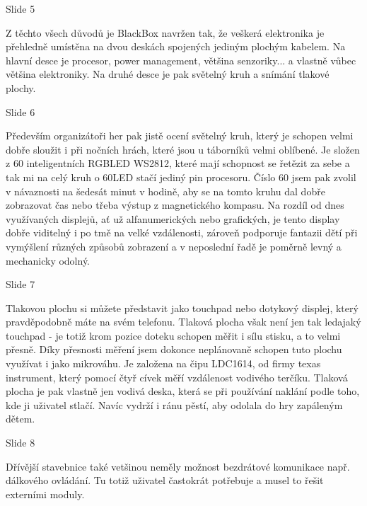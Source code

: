 
Slide 5 

Z těchto všech důvodů je BlackBox navržen tak, že  %
veškerá elektronika je přehledně umístěna na dvou deskách spojených jediným plochým kabelem.
Na hlavní desce je procesor, power management, většina
senzoriky... a vlastně vůbec většina elektroniky. Na druhé desce je pak světelný kruh
 a snímání tlakové plochy.
 
Slide 6

Především organizátoři her pak jistě ocení světelný kruh, který je schopen velmi dobře sloužit 
i při nočních hrách, které jsou u táborníků velmi oblíbené.
Je složen z 60 inteligentních RGBLED WS2812, které mají schopnost se řetězit za sebe 
a tak mi na celý kruh o 60LED stačí jediný pin procesoru. 
Číslo 60 jsem pak zvolil v návaznosti na šedesát minut v hodině, 
aby se na tomto kruhu dal dobře zobrazovat čas nebo třeba výstup z magnetického kompasu. 
Na rozdíl od dnes využívaných displejů, ať už alfanumerických nebo grafických, 
je tento display dobře viditelný i po tmě na velké vzdálenosti, 
zároveň podporuje fantazii dětí při vymýšlení různých způsobů zobrazení 
a v neposlední řadě je poměrně levný a mechanicky odolný. 


Slide 7

Tlakovou plochu si můžete představit jako touchpad nebo dotykový displej, který pravděpodobně máte na svém telefonu.
Tlaková plocha však není jen tak ledajaký touchpad -  je totiž krom pozice doteku 
schopen měřit i sílu stisku, a to velmi přesně.
Díky přesnosti měření jsem dokonce neplánovaně schopen tuto plochu využívat i jako mikrováhu. 
Je založena na čipu LDC1614, od firmy texas instrument, který
pomocí čtyř cívek měří vzdálenost vodivého terčíku. Tlaková plocha je pak vlastně 
jen vodivá deska, která se při používání naklání podle toho, kde ji uživatel stlačí.
Navíc vydrží i ránu pěstí, aby odolala do hry zapáleným dětem.

Slide 8

Dřívější stavebnice také vetšinou neměly možnost bezdrátové komunikace např. dálkového ovládání.
Tu totiž uživatel častokrát potřebuje a musel to řešit externími moduly.

